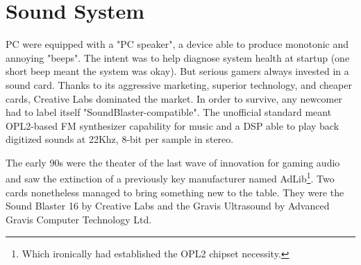 \section{Sound System}
PC were equipped with a "PC speaker", a device able to produce monotonic and annoying "beeps". The intent was to help diagnose system health at startup (one short beep meant the system was okay). But serious gamers always invested in a sound card. Thanks to its aggressive marketing, superior technology, and cheaper cards, Creative Labs dominated the market. In order to survive, any newcomer had to label itself "SoundBlaster-compatible". The unofficial standard meant OPL2-based FM synthesizer capability for music and a DSP able to play back digitized sounds at 22Khz, 8-bit per sample in stereo.\\
\par
 The early 90s were the theater of the last wave of innovation for gaming audio and saw the extinction of a previously key manufacturer named AdLib\footnote{Which ironically had established the OPL2 chipset necessity.}. Two cards nonetheless managed to bring something new to the table. They were the Sound Blaster 16 by Creative Labs and the Gravis Ultrasound by Advanced Gravis Computer Technology Ltd.\\

\vspace{-2mm}
